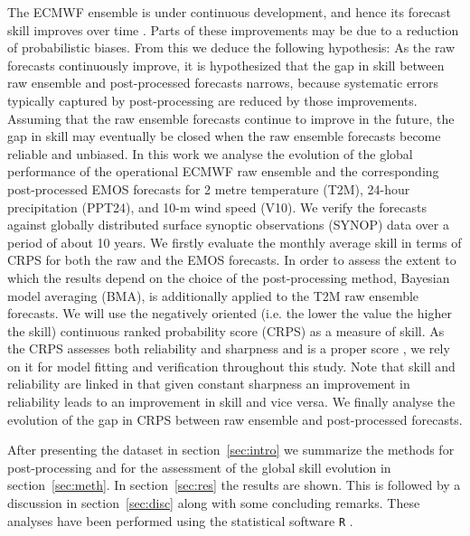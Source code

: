 The ECMWF ensemble is under continuous development, and hence its
forecast skill improves over time \citep{Buiz98,Buiz07,Rich13,Haid14}.
Parts of these improvements may be due to a reduction of probabilistic
biases. From this we deduce the following hypothesis: As the raw
forecasts continuously improve, it is hypothesized that the gap in
skill between raw ensemble and post-processed forecasts narrows,
because systematic errors typically captured by post-processing are
reduced
by those improvements.
Assuming that the raw ensemble forecasts continue to
improve in the future, the gap in skill may eventually be closed when
the raw ensemble forecasts become reliable and unbiased.  In this work
we analyse the evolution of the global performance of the operational
ECMWF raw ensemble and the corresponding post-processed EMOS forecasts
for 2 metre temperature (T2M), 24-hour precipitation (PPT24), and 10-m
wind speed (V10). We verify the forecasts against globally distributed
surface synoptic observations (SYNOP) data over a period of about 10
years. We firstly evaluate the monthly average skill in terms of CRPS
for both the raw and the EMOS forecasts. In order to assess the extent
to which the results depend on the choice of the post-processing
method, Bayesian model averaging (BMA), \citet{Raft05,Fra10} is
additionally applied to the T2M raw ensemble forecasts. We will use
the negatively oriented (i.e. the lower the value the higher the
skill) continuous ranked probability score (CRPS) \citep{Math76} as a
measure of skill. As the CRPS assesses both reliability and sharpness
and is a proper score \citep{Gneit07b}, we rely on it for model fitting
and verification throughout this study. Note that skill and
reliability are linked in that given constant sharpness an improvement
in reliability leads to an improvement in skill and vice versa. We
finally analyse the evolution of the gap in CRPS between raw ensemble
and post-processed forecasts.

After presenting the dataset in section~\ref{sec:intro} we summarize
the methods for post-processing and for the assessment of the global
skill evolution in section~\ref{sec:meth}. In section~\ref{sec:res}
the results are shown.  This is followed by a discussion in
section~\ref{sec:disc} along with some concluding
remarks. These
analyses have been performed using the statistical software \texttt{R}
\citep{R2013}.


